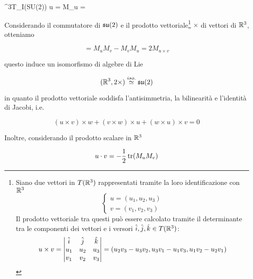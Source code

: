 	{\R^{3}}{T_{I}(SU(2))}
	{u = }
	{M_{u} = }

Considerando il commutatore di $ \mathfrak{su}(2) $ e il prodotto vettoriale\footnote{%
	Siano due vettori in $ T(\mathbb{R}^{3}) $ rappresentati tramite la loro identificazione con $ \mathbb{R}^{3} $
	\begin{equation*}
		\begin{cases}
			u = (u_{1},u_{2},u_{3}) \\
			v = (v_{1},v_{2},v_{3})
		\end{cases}
	\end{equation*}
	Il prodotto vettoriale tra questi può essere calcolato tramite il determinante tra le componenti dei vettori e i versori $ \hat{i},\hat{j},\hat{k} \in T(\mathbb{R}^{3}) $:
	\begin{equation*}
		u \times v = %
		\mdet{ %
				\hat{i} & \hat{j} & \hat{k} \\
				u_{1} & u_{2} & u_{3} \\
				v_{1} & v_{2} & v_{3} %
				} %
		= (u_{2} v_{3} - u_{3} v_{2}, u_{3} v_{1} - u_{1} v_{3}, u_{1} v_{2} - u_{2} v_{1})
	\end{equation*} %
} $ \times $ di vettori di $ \mathbb{R}^{3} $, otteniamo

\begin{equation}
	[M_{u},M_{v}] = M_{u} M_{v} - M_{v} M_{u} = 2 M_{u \times v}
\end{equation}

questo induce un isomorfismo di algebre di Lie

\begin{equation}
	(\mathbb{R}^{3}, 2 \times) \stackrel{iso.}{\simeq} \mathfrak{su}(2)
\end{equation}

in quanto il prodotto vettoriale soddisfa l'antisimmetria, la bilinearità e l'identità di Jacobi, i.e.

\begin{equation}
	(u \times v) \times w + (v \times w) \times u + (w \times u) \times v = 0
\end{equation}

Inoltre, considerando il prodotto scalare in $ \mathbb{R}^{3} $

\begin{equation}
	u \cdot v = - \dfrac{1}{2} \tr(M_{u} M_{v})
\end{equation}

